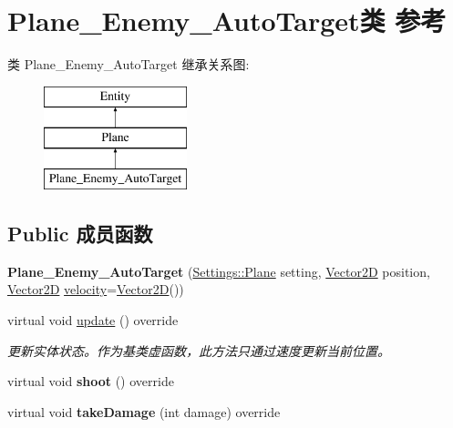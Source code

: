\hypertarget{class_plane___enemy___auto_target}{}\section{Plane\+\_\+\+Enemy\+\_\+\+Auto\+Target类 参考}
\label{class_plane___enemy___auto_target}
类 Plane\+\_\+\+Enemy\+\_\+\+Auto\+Target 继承关系图\+:\begin{figure}[H]
\begin{center}
\leavevmode
\includegraphics[height=3.000000cm]{class_plane___enemy___auto_target}
\end{center}
\end{figure}
\subsection*{Public 成员函数}
\begin{DoxyCompactItemize}
\item 
\mbox{\label{class_plane___enemy___auto_target_abf4224e6d4c79583016c98dc8747f3ad}} 
{\bfseries Plane\+\_\+\+Enemy\+\_\+\+Auto\+Target} (\hyperlink{struct_settings_1_1_plane}{Settings\+::\+Plane} setting, \hyperlink{structbasic__vector2_d}{Vector2D} position, \hyperlink{structbasic__vector2_d}{Vector2D} \hyperlink{class_entity_a386d25b56772b8913eb3e5adc636f6e0}{velocity}=\hyperlink{structbasic__vector2_d}{Vector2D}())
\item 
virtual void \hyperlink{class_plane___enemy___auto_target_a79e6eda540d282205ce6151ae0b304ca}{update} () override
\begin{DoxyCompactList}\small\item\em 更新实体状态。作为基类虚函数，此方法只通过速度更新当前位置。 \end{DoxyCompactList}\item 
\mbox{\label{class_plane___enemy___auto_target_a18e2115af4e2ebb50c920ee9ab2e42ad}} 
virtual void {\bfseries shoot} () override
\item 
\mbox{\label{class_plane___enemy___auto_target_a1f9400c23995c6ac67fe04309f98cf29}} 
virtual void {\bfseries take\+Damage} (int damage) override
\end{DoxyCompactItemize}
